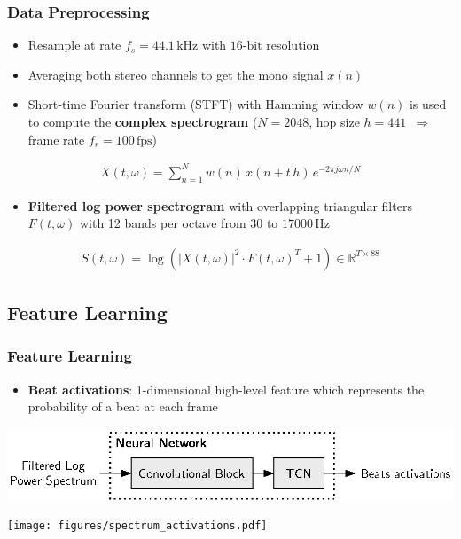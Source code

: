 \documentclass{beamer}
\begin{document}
\begin{frame}
\frametitle{Data Preprocessing}
\begin{itemize}
\item Resample at rate $f_s = 44.1 \,\text{kHz}$ with $16\text{-bit}$ resolution
\item Averaging both stereo channels to get the mono signal $x(n)$ 
\item Short-time Fourier transform (STFT) with Hamming window $w(n)$ is used to compute the \textbf{complex spectrogram} ($N = 2048$, hop size $h=441$ $\,\Rightarrow\,$ frame rate $f_r = 100 \,\text{fps}$)
\end{itemize}
\vspace{-0.5em}
\begin{align}
X(t,\omega) = \sum_{n = 1}^{N} w(n) \, x(n + t\,h) \, e^{-2 \pi j \omega n /N}
\end{align} 
\vspace{-0.5em}
\begin{itemize}
\item \textbf{Filtered log power spectrogram} with overlapping triangular filters $F(t,\omega)$ with 12 bands per octave from $30$ to $\num[group-separator={,}]{17000} \, \text{Hz}$
\end{itemize}
\vspace{-0.5em}
\begin{align}
S(t,\omega) = \log \left( |X(t,\omega)|^2 \cdot F(t,\omega)^T + 1 \right) \in \mathbb R^{T\times88}  
\end{align} 


\end{frame}



\subsection{Feature Learning}

\begin{frame}
\frametitle{Feature Learning}
\begin{itemize}
\item \textbf{Beat activations}: 1-dimensional high-level feature which represents the probability of a beat at each frame 
\end{itemize}

\begin{minipage}{\textwidth} 
\centering
\includegraphics[scale=0.8]{figures/neural_net.eps}
\end{minipage}
\vspace{2em}

\begin{minipage}{\textwidth} 
\centering
\texttt{[image: figures/spectrum\_activations.pdf]}
\end{minipage}
 
\end{frame}
\end{document}

